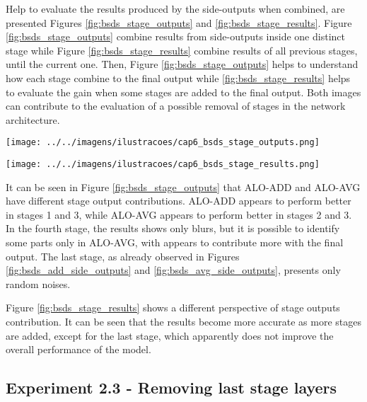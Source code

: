 Help to evaluate the results produced by the side-outputs when combined, are presented Figures \ref{fig:bsds_stage_outputs} and \ref{fig:bsds_stage_results}.
Figure \ref{fig:bsds_stage_outputs} combine results from side-outputs inside one distinct stage while Figure \ref{fig:bsds_stage_results} combine results of all previous stages, until the current one.
Then, Figure \ref{fig:bsds_stage_outputs} helps to understand how each stage combine to the final output while \ref{fig:bsds_stage_results} helps to evaluate the gain when some stages are added to the final output.
Both images can contribute to the evaluation of a possible removal of stages in the network architecture.

\begin{figure*}%
  \centering
  \caption{Side-outputs of each stage of ALO-ADD and ALO-AVG methods, trained with BSDS 500 using MORPH/UPPER ground truth methods.}
  \texttt{[image: ../../imagens/ilustracoes/cap6\_bsds\_stage\_outputs.png]}
  \sourceOwn
  \label{fig:bsds_stage_outputs}
\end{figure*}

\begin{figure*}%
  \centering
  \caption{Results of ALO-ADD and ALO-AVG methods with side-outputs until each stage, trained with BSDS 500 using MORPH/UPPER ground truth methods.}
  \texttt{[image: ../../imagens/ilustracoes/cap6\_bsds\_stage\_results.png]}
  \sourceOwn
  \label{fig:bsds_stage_results}
\end{figure*}

It can be seen in Figure \ref{fig:bsds_stage_outputs} that ALO-ADD and ALO-AVG have different stage output contributions.
ALO-ADD appears to perform better in stages 1 and 3, while ALO-AVG appears to perform better in stages 2 and 3.
In the fourth stage, the results shows only blurs, but it is possible to identify some parts only in ALO-AVG, with appears to contribute more with the final output.
The last stage, as already observed in Figures \ref{fig:bsds_add_side_outputs} and \ref{fig:bsds_avg_side_outputs}, presents only random noises.

Figure \ref{fig:bsds_stage_results} shows a different perspective of stage outputs contribution.
It can be seen that the results become more accurate as more stages are added, except for the last stage, which apparently does not improve the overall performance of the model.

\subsection{Experiment 2.3 - Removing last stage layers}
\label{ssec:bsds_subexp3}


